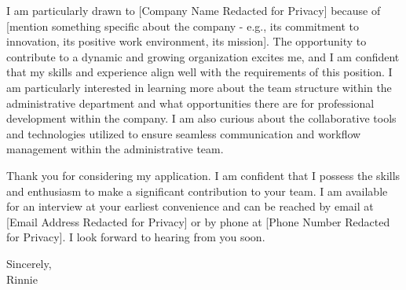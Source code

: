 \documentclass[letterpaper,11pt]{article}
\begin{document}
I am particularly drawn to [Company Name Redacted for Privacy] because of [mention something specific about the company - e.g., its commitment to innovation, its positive work environment, its mission]. The opportunity to contribute to a dynamic and growing organization excites me, and I am confident that my skills and experience align well with the requirements of this position. I am particularly interested in learning more about the team structure within the administrative department and what opportunities there are for professional development within the company. I am also curious about the collaborative tools and technologies utilized to ensure seamless communication and workflow management within the administrative team.
\vspace{10pt}

Thank you for considering my application. I am confident that I possess the skills and enthusiasm to make a significant contribution to your team. I am available for an interview at your earliest convenience and can be reached by email at [Email Address Redacted for Privacy] or by phone at [Phone Number Redacted for Privacy]. I look forward to hearing from you soon.
\vspace{20pt}

Sincerely, \\
\vspace{40pt} %
Rinnie
\end{document}

